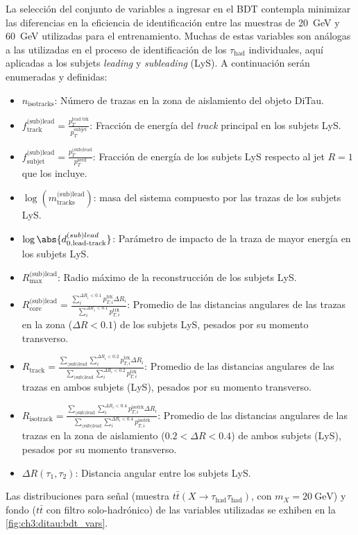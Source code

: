 La selección del conjunto de variables a ingresar en el BDT contempla minimizar las diferencias en la eficiencia de identificación entre las muestras de \SI{20}{\GeV} y \SI{60}{\GeV} utilizadas para el entrenamiento. Muchas de estas variables son análogas a las utilizadas en el proceso de identificación de los $\tau_{\text{had}}$ individuales, aquí aplicadas a los subjets \textit{leading} y \textit{subleading} (LyS). A continuación serán enumeradas y definidas:
\begin{itemize}
    \item $n_{\text{isotracks}}$: Número de trazas en la zona de aislamiento del objeto DiTau.

    \item $\displaystyle f^{\text{(sub)lead}}_{\text{track}} = \frac{p_T^{\text{lead trk}}}{p_T^{\text{subjet}}}$: Fracción de energía del \textit{track} principal en los subjets LyS.
    \item $\displaystyle f^{\text{(sub)lead}}_{\text{subjet}} = \frac{p_T^{\text{(sub)lead}}}{p_T^{\text{seed}}}$: Fracción de energía de los subjets LyS respecto al jet $R = 1$ que los incluye.
    \item $\log(m_{\text{tracks}}^{\text{(sub)lead}})$: masa del sistema compuesto por las trazas de los subjets LyS.
    
    \item $\log\abs{d_{\text{0,lead-track}}^{\text(sub)lead}}$: Parámetro de impacto de la traza de mayor energía en los subjets LyS.
    \item $R^{\text{(sub)lead}}_{\text{max}}$: Radio máximo de la reconstrucción de los subjets LyS.
    \item $\displaystyle R^{\text{(sub)lead}}_{\text{core}} = \frac{\sum_i^{\Delta R_i < 0.1} p_{T, i}^{\text{trk}} \Delta R_i}{\sum_i^{\Delta R_i < 0.1} p_{T, i}^{\text{trk}}}$: Promedio de las distancias angulares de las trazas en la zona  ($\Delta R < 0.1$) de los subjets LyS, pesados por su momento transverso.
    \item $\displaystyle R_{\text{track}} = \frac{\sum_{\text{(sub)lead}} \sum_i^{\Delta R_i < 0.2} p_{T, i}^{\text{trk}} \Delta R_i}{\sum_{\text{(sub)lead}} \sum_i^{\Delta R_i < 0.2} p_{T, i}^{\text{trk}}}$: Promedio de las distancias angulares de las trazas en ambos subjets (LyS), pesados por su momento transverso.
    \item $\displaystyle R_{\text{isotrack}} = \frac{\sum_{\text{(sub)lead}} \sum_i^{\Delta R_i < 0.4} p_{T, i}^{\text{isotrk}} \Delta R_i}{\sum_{\text{(sub)lead}} \sum_i^{\Delta R_i < 0.4} p_{T, i}^{\text{isotrk}}}$: Promedio de las distancias angulares de las trazas en la zona de aislamiento ($0.2 < \Delta R < 0.4$) de ambos subjets (LyS), pesados por su momento transverso.
    \item $\Delta R(\tau_1, \tau_2)$: Distancia angular entre los subjets LyS.
\end{itemize}
Las distribuciones para señal (muestra $t\bar{t}(X \to \tau_{\text{had}} \tau_{\text{had}})$, con $m_X = \SI{20}{\GeV}$) y fondo ($t\bar{t}$ con filtro solo-hadrónico) de las variables utilizadas se exhiben en la \cref{fig:ch3:ditau:bdt_vars}.

